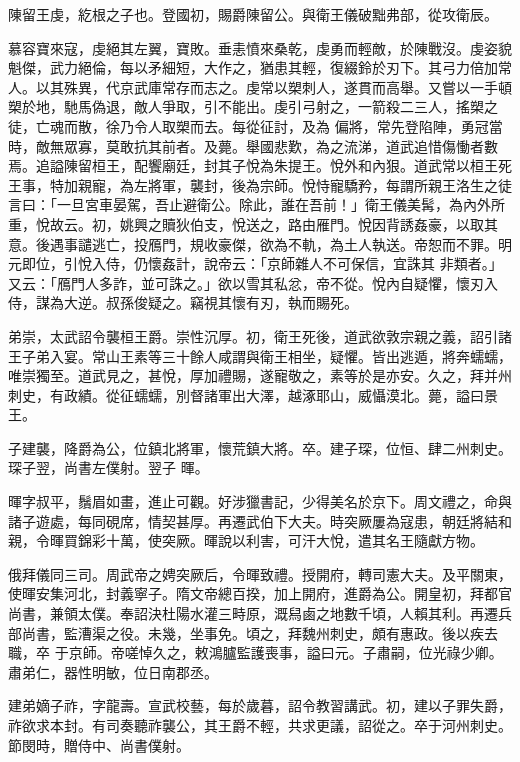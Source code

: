 \begin{pinyinscope}
 陳留王虔，紇根之子也。登國初，賜爵陳留公。與衛王儀破黜弗部，從攻衛辰。



 慕容寶來寇，虔絕其左翼，寶敗。垂恚憤來桑乾，虔勇而輕敵，於陳戰沒。虔姿貌魁傑，武力絕倫，每以矛細短，大作之，猶患其輕，復綴鈴於刃下。其弓力倍加常人。以其殊異，代京武庫常存而志之。虔常以槊刺人，遂貫而高舉。又嘗以一手頓槊於地，馳馬偽退，敵人爭取，引不能出。虔引弓射之，一箭殺二三人，搖槊之徒，亡魂而散，徐乃令人取槊而去。每從征討，及為
 偏將，常先登陷陣，勇冠當時，敵無眾寡，莫敢抗其前者。及薨。舉國悲歎，為之流涕，道武追惜傷慟者數焉。追謚陳留桓王，配饗廟廷，封其子悅為朱提王。悅外和內狠。道武常以桓王死王事，特加親寵，為左將軍，襲封，後為宗師。悅恃寵驕矜，每謂所親王洛生之徒言曰：「一旦宮車晏駕，吾止避衛公。除此，誰在吾前！」衛王儀美髯，為內外所重，悅故云。初，姚興之贖狄伯支，悅送之，路由雁門。悅因背誘姦豪，以取其意。後遇事譴逃亡，投鴈門，規收豪傑，欲為不軌，為土人執送。帝恕而不罪。明元即位，引悅入侍，仍懷姦計，說帝云：「京師雜人不可保信，宜誅其
 非類者。」又云：「鴈門人多詐，並可誅之。」欲以雪其私忿，帝不從。悅內自疑懼，懷刃入侍，謀為大逆。叔孫俊疑之。竊視其懷有刃，執而賜死。



 弟崇，太武詔令襲桓王爵。崇性沉厚。初，衛王死後，道武欲敦宗親之義，詔引諸王子弟入宴。常山王素等三十餘人咸謂與衛王相坐，疑懼。皆出逃遁，將奔蠕蠕，唯崇獨至。道武見之，甚悅，厚加禮賜，遂寵敬之，素等於是亦安。久之，拜并州刺史，有政績。從征蠕蠕，別督諸軍出大澤，越涿耶山，威懾漠北。薨，謚曰景王。



 子建襲，降爵為公，位鎮北將軍，懷荒鎮大將。卒。建子琛，位恒、肆二州刺史。琛子翌，尚書左僕射。翌子
 暉。



 暉字叔平，鬚眉如畫，進止可觀。好涉獵書記，少得美名於京下。周文禮之，命與諸子遊處，每同硯席，情契甚厚。再遷武伯下大夫。時突厥屢為寇患，朝廷將結和親，令暉買錦彩十萬，使突厥。暉說以利害，可汗大悅，遣其名王隨獻方物。



 俄拜儀同三司。周武帝之娉突厥后，令暉致禮。授開府，轉司憲大夫。及平關東，使暉安集河北，封義寧子。隋文帝總百揆，加上開府，進爵為公。開皇初，拜都官尚書，兼領太僕。奉詔決杜陽水灌三畤原，溉舄鹵之地數千頃，人賴其利。再遷兵部尚書，監漕渠之役。未幾，坐事免。頃之，拜魏州刺史，頗有惠政。後以疾去職，卒
 于京師。帝嗟悼久之，敕鴻臚監護喪事，謚曰元。子肅嗣，位光祿少卿。肅弟仁，器性明敏，位日南郡丞。



 建弟嫡子祚，字龍壽。宣武校藝，每於歲暮，詔令教習講武。初，建以子罪失爵，祚欲求本封。有司奏聽祚襲公，其王爵不輕，共求更議，詔從之。卒于河州刺史。節閔時，贈侍中、尚書僕射。




\end{pinyinscope}
